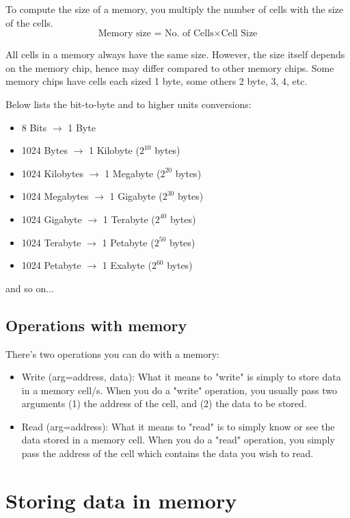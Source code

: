 \documentclass{article}
\begin{document}
To compute the size of a memory, you multiply the number of cells with the size of the cells.
$$\text{Memory size = No. of Cells}\times\text{Cell Size}$$

\noindent All cells in a memory always have the same size. However, the size itself depends on the memory chip, hence may differ compared to other memory chips. Some memory chips have cells each sized 1 byte, some others 2 byte, 3, 4, etc.

\vspace{0.5cm}

\noindent Below lists the bit-to-byte and to higher units conversions:

\begin{itemize}
    \item 8 Bits $\rightarrow$ 1 Byte
    \item 1024 Bytes $\rightarrow$ 1 Kilobyte ($2^{10}$ bytes)
    \item 1024 Kilobytes $\rightarrow$ 1 Megabyte ($2^{20}$ bytes)
    \item 1024 Megabytes $\rightarrow$ 1 Gigabyte ($2^{30}$ bytes)
    \item 1024 Gigabyte $\rightarrow$ 1 Terabyte ($2^{40}$ bytes)
    \item 1024 Terabyte $\rightarrow$ 1 Petabyte ($2^{50}$ bytes)
    \item 1024 Petabyte $\rightarrow$ 1 Exabyte ($2^{60}$ bytes)
\end{itemize}
\noindent and so on...

\subsection{Operations with memory}
There's two operations you can do with a memory:
\begin{itemize}
    \item Write (arg=address, data): What it means to "write" is simply to store data in a memory cell/s. When you do a "write" operation, you usually pass two arguments (1) the address of the cell, and (2) the data to be stored.
    \item Read (arg=address): What it means to "read" is to simply know or see the data stored in a memory cell. When you do a "read" operation, you simply pass the address of the cell which contains the data you wish to read.
\end{itemize}

\section{Storing data in memory}
\end{document}
